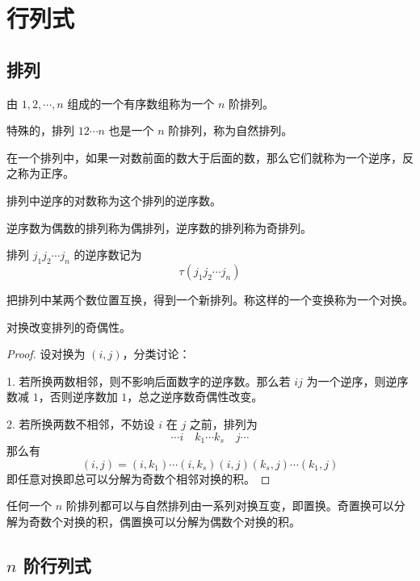 \chapter{行列式}

\section{排列}

\begin{definition}
	由 $1,2,\cdots,n$ 组成的一个有序数组称为一个 $n$ 阶排列。
\end{definition}

特殊的，排列 $12\cdots n$ 也是一个 $n$ 阶排列，称为自然排列。

\begin{definition}
	在一个排列中，如果一对数前面的数大于后面的数，那么它们就称为一个逆序，反之称为正序。
	
	排列中逆序的对数称为这个排列的逆序数。
\end{definition}

逆序数为偶数的排列称为偶排列，逆序数的排列称为奇排列。

排列 $j_1j_2\cdots j_n$ 的逆序数记为
$$\tau(j_1j_2\cdots j_n)$$

\begin{definition}
	把排列中某两个数位置互换，得到一个新排列。称这样的一个变换称为一个对换。
\end{definition}

\begin{theorem}
	对换改变排列的奇偶性。
\end{theorem}

\begin{proof}
	设对换为 $(i,j)$，分类讨论：

	1. 若所换两数相邻，则不影响后面数字的逆序数。那么若 $ij$ 为一个逆序，则逆序数减 $1$，否则逆序数加 $1$，总之逆序数奇偶性改变。

	2. 若所换两数不相邻，不妨设 $i$ 在 $j$ 之前，排列为
	$$\cdots i \quad k_1 \cdots k_s \quad j\cdots$$
	那么有
	$$(i,j)=(i,k_1)\cdots(i,k_s)(i,j)(k_s,j)\cdots(k_1,j)$$
	即任意对换即总可以分解为奇数个相邻对换的积。
\end{proof}

任何一个 $n$ 阶排列都可以与自然排列由一系列对换互变，即置换。奇置换可以分解为奇数个对换的积，偶置换可以分解为偶数个对换的积。

\section{\texorpdfstring{$n$ 阶行列式}{n 阶行列式}}


